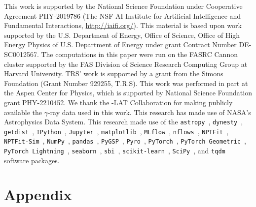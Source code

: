 \documentclass[prd,aps,10pt,nofootinbib,twocolumn,superscriptaddress,preprintnumbers,balancelastpage,longbibliography,floatfix]{revtex4-2}
\begin{document}
This work is supported by the National Science Foundation under Cooperative Agreement PHY-2019786 (The NSF AI Institute for Artificial Intelligence and Fundamental Interactions, \url{http://iaifi.org/}).
This material is based upon work supported by the U.S. Department of Energy, Office of Science, Office of High Energy Physics of U.S. Department of Energy under grant Contract Number DE-SC0012567. The computations in this paper were run on the FASRC Cannon cluster supported by the FAS Division of Science Research Computing Group at Harvard University. TRS' work is supported by a grant from the Simons Foundation (Grant Number 929255, T.R.S). This work was performed in part at the Aspen Center for Physics, which is supported by National Science Foundation grant PHY-2210452.
We thank the \Fermi-LAT Collaboration for making publicly available the $\gamma$-ray data used in this work.
This research has made use of NASA's Astrophysics Data System. 
This research made use of the \texttt{astropy}~\cite{Price-Whelan:2018hus,Robitaille:2013mpa}, \texttt{dynesty}~\cite{Speagle_2020}, \texttt{getdist}~\cite{Lewis:2019xzd}, \texttt{IPython}~\cite{PER-GRA:2007}, \texttt{Jupyter}~\cite{Kluyver2016JupyterN}, \texttt{matplotlib}~\cite{Hunter:2007}, \texttt{MLflow}~\cite{10.1145/3399579.3399867}, \texttt{nflows}~\cite{nflows}, \texttt{NPTFit}~\cite{Mishra-Sharma:2016gis}, \texttt{NPTFit-Sim}~\cite{NPTFit-Sim}, \texttt{NumPy}~\cite{harris2020array}, \texttt{pandas}~\cite{pandas:2010}, \texttt{PyGSP}~\cite{michael_defferrard_2017_1003158}, \texttt{Pyro}~\cite{bingham2019pyro}, \texttt{PyTorch}~\cite{NEURIPS2019_9015}, \texttt{PyTorch Geometric}~\cite{Fey/Lenssen/2019}, \texttt{PyTorch Lightning}~\cite{william_falcon_2020_3828935}, \texttt{seaborn}~\cite{seaborn}, \texttt{sbi}~\cite{tejero-cantero2020sbi}, \texttt{scikit-learn}~\cite{JMLR:v12:pedregosa11a}, \texttt{SciPy}~\cite{2020SciPy-NMeth}, and \texttt{tqdm}~\cite{casper_da_costa_luis_2021_5517697} software packages.

\appendix
\section*{Appendix}

\clearpage



\end{document}
